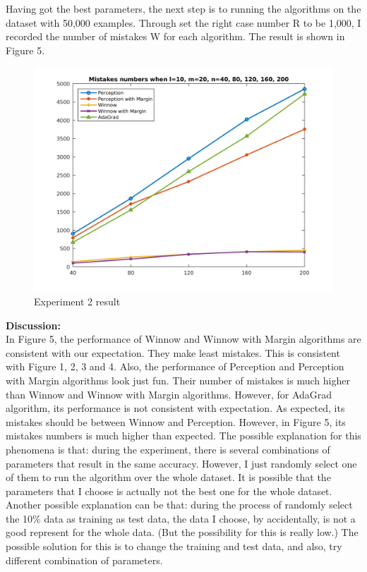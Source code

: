 \begin{enumerate}
Having got the best parameters, the next step is to running the algorithms on the dataset with 50,000 examples. Through set the right case number R to be 1,000, I recorded the number of mistakes W for each algorithm. The result is shown in Figure 5.\\

\begin{figure}[H] 
\begin{center}
\includegraphics[width=7in]{Ex2mistake1.png}
\caption{Experiment 2 result}
\end{center}
\end{figure}

{\bf Discussion:\\}
In Figure 5, the performance of Winnow and Winnow with Margin algorithms are consistent with our expectation. They make least mistakes. This is consistent with Figure 1, 2, 3 and 4. Also, the performance of Perception and Perception with Margin algorithms look just fun. Their number of mistakes is much higher than Winnow and Winnow with Margin algorithms. However, for AdaGrad algorithm, its performance is not consistent with expectation. As expected, its mistakes should be between Winnow and Perception. However, in Figure 5, its mistakes numbers is much higher than expected. The possible explanation for this phenomena is that: during the experiment, there is several combinations of parameters that result in the same accuracy. However, I just randomly select one of them to run the algorithm over the whole dataset. It is possible that the parameters that I choose is actually not the best one for the whole dataset. Another possible explanation can be that: during the process of randomly select the 10\% data as training as test data, the data I choose, by accidentally, is not a good represent for the whole data. (But the possibility for this is really low.) The possible solution for this is to change the training and test data, and also, try different combination of parameters.\\


\end{enumerate}
